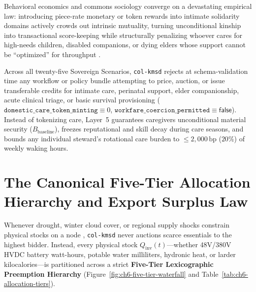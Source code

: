 Behavioral economics and commons sociology converge on a devastating empirical law: introducing
piece-rate monetary or token rewards into intimate solidarity domains actively crowds out intrinsic
mutuality, turning unconditional kinship into transactional score-keeping while structurally
penalizing whoever cares for high-needs children, disabled companions, or dying elders whose support
cannot be ``optimized'' for throughput \parencite{mansbridge1980,kimmerer2013,han2015}.

\begin{invariant}
\label{inv:ch6-zero-care-tokens}
Across all twenty-five Sovereign Scenarios, \texttt{col-kmsd} rejects at schema-validation time
any workflow or policy bundle attempting to price, auction, or issue transferable credits for
intimate care, perinatal support, elder companionship, acute clinical triage, or basic survival
provisioning ($\mathtt{domestic\_care\_token\_minting} \equiv 0$,
$\mathtt{workfare\_coercion\_permitted} \equiv \mathsf{false}$). Instead of tokenizing care, Layer~5
guarantees caregivers unconditional material security ($B_{\mathrm{baseline}}$), freezes reputational
and skill decay during care seasons, and bounds any individual steward's rotational care burden to
$\le 2{,}000\,\mathrm{bp}$ ($20\%$) of weekly waking hours.
\end{invariant}

\section{The Canonical Five-Tier Allocation Hierarchy and Export Surplus Law}
\label{sec:ch6-five-tier-hierarchy}

Whenever drought, winter cloud cover, or regional supply shocks constrain physical stocks on a node
\parencite{rockstrom2009safe,holling1973,georgescu1971}, \texttt{col-kmsd} never auctions scarce
essentials to the highest bidder. Instead, every physical stock $Q_{\mathrm{inv}}(t)$---whether
48V/380V HVDC battery watt-hours, potable water milliliters, hydronic heat, or larder kilocalories---is
partitioned across a strict \textbf{Five-Tier Lexicographic Preemption Hierarchy}
(Figure~\ref{fig:ch6-five-tier-waterfall} and Table~\ref{tab:ch6-allocation-tiers}).

